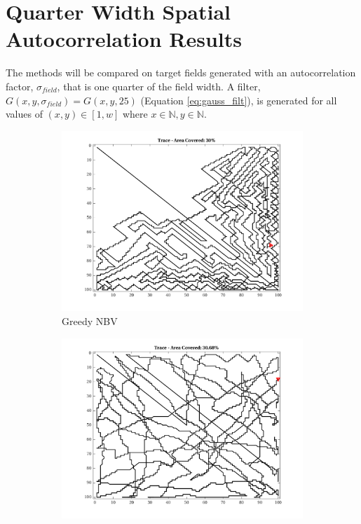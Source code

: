 \FloatBarrier
\clearpage

\section{Quarter Width Spatial Autocorrelation Results}
The methods will be compared on target fields generated with an autocorrelation factor, $\sigma_{field}$, that is one quarter of the field width. A filter, $G(x,y,\sigma_{field}) = G(x,y,25)$ (Equation \ref{eq:gauss_filt}), is generated for all values of $(x,y) \in [1, w]$ where $x \in \mathbb{N}, y \in \mathbb{N}$.

\begin{figure}[htb!]
    \centering
    \begin{subfigure}[t]{0.25\textwidth}
        \centering
        \includegraphics[width=\linewidth]{figures/path_greedy_30p_100x100_sf_25_seed_2.png}
        \captionsetup{skip=0.20\baselineskip,size=footnotesize}
        \caption{Greedy NBV}
    \end{subfigure}%
    \begin{subfigure}[t]{0.25\textwidth}
        \centering
        \includegraphics[width=\linewidth]{figures/path_mc_30p_100x100_sf_25_seed_2.png}

\end{subfigure}
\end{figure}
